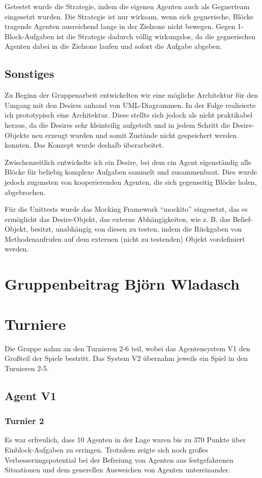 \documentclass[runningheads]{llncs}
\begin{document}
Getestet wurde die Strategie, indem die eigenen Agenten auch als Gegnerteam eingesetzt wurden. Die Strategie ist nur wirksam, wenn sich gegnerische, Blöcke tragende Agenten ausreichend lange in der Zielzone nicht bewegen. Gegen 1-Block-Aufgaben ist die Strategie dadurch völlig wirkungslos, da die gegnerischen Agenten dabei in die Zielzone laufen und sofort die Aufgabe abgeben.

\subsection{Sonstiges}
Zu Beginn der Gruppenarbeit entwickelten wir eine mögliche Architektur für den Umgang mit den Desires anhand von UML-Diagrammen. In der Folge realisierte ich prototypisch eine Architektur. Diese stellte sich jedoch als nicht praktikabel heraus, da die Desires sehr kleinteilig aufgeteilt und in jedem Schritt die Desire-Objekte neu erzeugt wurden und somit Zustände nicht gespeichert werden konnten. Das Konzept wurde deshalb überarbeitet.

Zwischenzeitlich entwickelte ich ein Desire, bei dem ein Agent eigenständig alle Blöcke für beliebig komplexe Aufgaben sammelt und zusammenbaut. Dies wurde jedoch zugunsten von kooperierenden Agenten, die sich gegenseitig Blöcke holen, abgebrochen.

Für die Unittests wurde das Mocking Framework "`mockito"' eingesetzt, das es ermöglicht das Desire-Objekt, das externe Abhängigkeiten, wie z. B. das Belief-Objekt, besitzt, unabhängig von diesen zu testen, indem die Rückgaben von Methodenaufrufen auf dem externen (nicht zu testenden) Objekt vordefiniert werden. 

\section{Gruppenbeitrag Björn Wladasch}

\section{Turniere}
Die Gruppe nahm an den Turnieren 2-6 teil, wobei das Agentensystem V1 den Großteil der Spiele bestritt. Das System V2 übernahm jeweils ein Spiel in den Turnieren 2-5. 

\subsection{Agent V1}
\subsubsection{Turnier 2}
Es war erfreulich, dass 10 Agenten in der Lage waren bis zu 370 Punkte über Einblock-Aufgaben zu erringen. Trotzdem zeigte sich noch großes Verbesserungspotential bei der Befreiung von Agenten aus festgefahrenen Situationen und dem generellen Ausweichen von Agenten untereinander.
\end{document}
